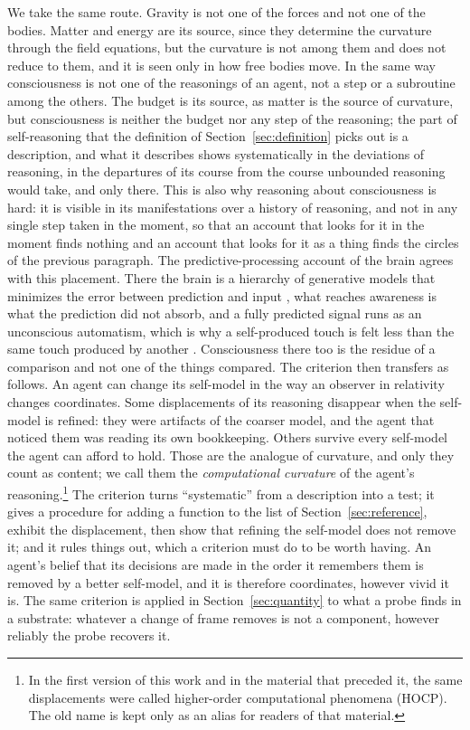 We take the same route. Gravity is not one of the forces and not one of the bodies. Matter and energy
are its source, since they determine the curvature through the field equations, but the curvature is
not among them and does not reduce to them, and it is seen only in how free bodies move. In the same
way consciousness is not one of the reasonings of an agent, not a step or a subroutine among the
others. The budget is its source, as matter is the source of curvature, but consciousness is neither
the budget nor any step of the reasoning; the part of self-reasoning that the definition of
Section~\ref{sec:definition} picks out is a description, and what it describes shows systematically in
the deviations of reasoning, in the departures of its course from the course unbounded reasoning would
take, and only there. This is also why reasoning about consciousness is hard: it is visible in its manifestations over
a history of reasoning, and not in any single step taken in the moment, so that an account that looks
for it in the moment finds nothing and an account that looks for it as a thing finds the circles of
the previous paragraph. The predictive-processing account of the brain agrees with this placement.
There the brain is a hierarchy of generative models that minimizes the error between prediction and
input \citep{friston2010,clark2013}, what reaches awareness is what the prediction did not absorb,
and a fully predicted signal runs as an unconscious automatism, which is why a self-produced touch is
felt less than the same touch produced by another \citep{blakemore1998}. Consciousness there too is
the residue of a comparison and not one of the things compared. The criterion then transfers as
follows. An agent can change its self-model in
the way an observer in relativity changes coordinates. Some displacements of its reasoning disappear when the
self-model is refined: they were artifacts of the coarser model, and the agent that noticed them was
reading its own bookkeeping. Others survive every self-model the agent can afford to hold. Those are
the analogue of curvature, and only they count as content; we call them the \emph{computational
curvature} of the agent's reasoning.\footnote{In the first version of this work and in the material
that preceded it, the same displacements were called higher-order computational phenomena (HOCP). The
old name is kept only as an alias for readers of that material.} The criterion turns ``systematic'' from a
description into a test; it gives a procedure for adding a function to the list of
Section~\ref{sec:reference}, exhibit the displacement, then show that refining the self-model does not
remove it; and it rules things out, which a criterion must do to be worth having. An agent's belief
that its decisions are made in the order it remembers them is removed by a better self-model, and it is
therefore coordinates, however vivid it is. The same criterion is applied in Section~\ref{sec:quantity}
to what a probe finds in a substrate: whatever a change of frame removes is not a component, however
reliably the probe recovers it.

